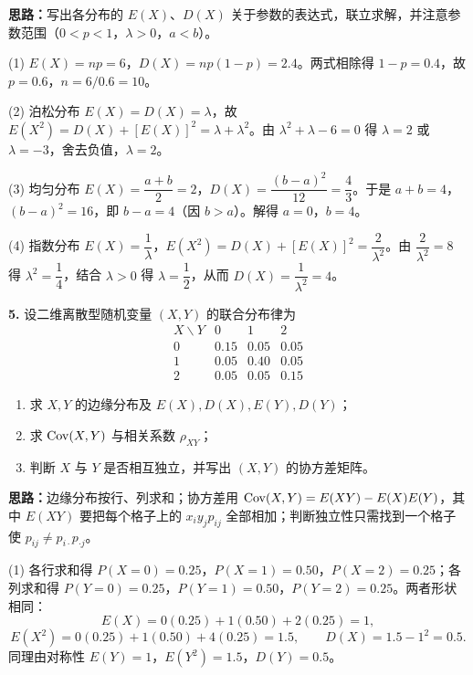 \ifshowsolutions%
\textbf{思路：}写出各分布的 $E(X)$、$D(X)$ 关于参数的表达式，联立求解，并注意参数范围（$0<p<1$，$\lambda>0$，$a<b$）。

(1) $E(X)=np=6$，$D(X)=np(1-p)=2.4$。两式相除得 $1-p=0.4$，故 $p=0.6$，$n=6/0.6=10$。

(2) 泊松分布 $E(X)=D(X)=\lambda$，故 $E(X^2)=D(X)+[E(X)]^2=\lambda+\lambda^2$。由 $\lambda^2+\lambda-6=0$ 得 $\lambda=2$ 或 $\lambda=-3$，舍去负值，$\lambda=2$。

(3) 均匀分布 $E(X)=\dfrac{a+b}{2}=2$，$D(X)=\dfrac{(b-a)^2}{12}=\dfrac43$。于是 $a+b=4$，$(b-a)^2=16$，即 $b-a=4$（因 $b>a$）。解得 $a=0$，$b=4$。

(4) 指数分布 $E(X)=\dfrac1\lambda$，$E(X^2)=D(X)+[E(X)]^2=\dfrac{2}{\lambda^2}$。由 $\dfrac{2}{\lambda^2}=8$ 得 $\lambda^2=\dfrac14$，结合 $\lambda>0$ 得 $\lambda=\dfrac12$，从而 $D(X)=\dfrac{1}{\lambda^2}=4$。


\else \answerarea[6] \fi

\textbf{5.} 设二维离散型随机变量 $(X,Y)$ 的联合分布律为
\[
\begin{array}{c|ccc}
X\backslash Y & 0 & 1 & 2\\
\hline
0 & 0.15 & 0.05 & 0.05\\
1 & 0.05 & 0.40 & 0.05\\
2 & 0.05 & 0.05 & 0.15
\end{array}
\]
\begin{enumerate}[label=(\arabic*)]
    \item 求 $X,Y$ 的边缘分布及 $E(X),D(X),E(Y),D(Y)$；
    \item 求 $\operatorname{Cov}(X,Y)$ 与相关系数 $\rho_{XY}$；
    \item 判断 $X$ 与 $Y$ 是否相互独立，并写出 $(X,Y)$ 的协方差矩阵。
\end{enumerate}

\ifshowsolutions%
\textbf{思路：}边缘分布按行、列求和；协方差用 $\operatorname{Cov}(X,Y)=E(XY)-E(X)E(Y)$，其中 $E(XY)$ 要把每个格子上的 $x_iy_jp_{ij}$ 全部相加；判断独立性只需找到一个格子使 $p_{ij}\ne p_{i\cdot}p_{\cdot j}$。

(1) 各行求和得 $P(X=0)=0.25$，$P(X=1)=0.50$，$P(X=2)=0.25$；各列求和得 $P(Y=0)=0.25$，$P(Y=1)=0.50$，$P(Y=2)=0.25$。两者形状相同：
\[
E(X)=0(0.25)+1(0.50)+2(0.25)=1,
\]
\[
E(X^2)=0(0.25)+1(0.50)+4(0.25)=1.5,\qquad D(X)=1.5-1^2=0.5.
\]
同理由对称性 $E(Y)=1$，$E(Y^2)=1.5$，$D(Y)=0.5$。

